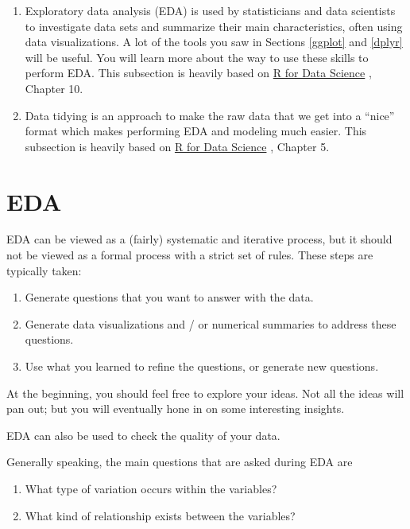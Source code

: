 \documentclass[
]{book}
\providecommand{\tightlist}{%
  \setlength{\itemsep}{0pt}\setlength{\parskip}{0pt}}
\theoremstyle{definition}
\theoremstyle{definition}
\theoremstyle{definition}
\theoremstyle{definition}
\theoremstyle{remark}
\begin{document}
\begin{enumerate}
\def\labelenumi{\arabic{enumi}.}
\item
  Exploratory data analysis (EDA) is used by statisticians and data scientists to investigate data sets and summarize their main characteristics, often using data visualizations. A lot of the tools you saw in Sections \ref{ggplot} and \ref{dplyr} will be useful. You will learn more about the way to use these skills to perform EDA. This subsection is heavily based on \href{https://r4ds.hadley.nz/}{R for Data Science} \citep{wickham2023}, Chapter 10.
\item
  Data tidying is an approach to make the raw data that we get into a ``nice'' format which makes performing EDA and modeling much easier. This subsection is heavily based on \href{https://r4ds.hadley.nz/}{R for Data Science} \citep{wickham2023}, Chapter 5.
\end{enumerate}

\hypertarget{eda}{%
\section{EDA}\label{eda}}

EDA can be viewed as a (fairly) systematic and iterative process, but it should not be viewed as a formal process with a strict set of rules. These steps are typically taken:

\begin{enumerate}
\def\labelenumi{\arabic{enumi}.}
\tightlist
\item
  Generate questions that you want to answer with the data.
\item
  Generate data visualizations and / or numerical summaries to address these questions.
\item
  Use what you learned to refine the questions, or generate new questions.
\end{enumerate}

At the beginning, you should feel free to explore your ideas. Not all the ideas will pan out; but you will eventually hone in on some interesting insights.

EDA can also be used to check the quality of your data.

Generally speaking, the main questions that are asked during EDA are

\begin{enumerate}
\def\labelenumi{\arabic{enumi}.}
\tightlist
\item
  What type of variation occurs within the variables?
\item
  What kind of relationship exists between the variables?
\end{enumerate}
\end{document}

